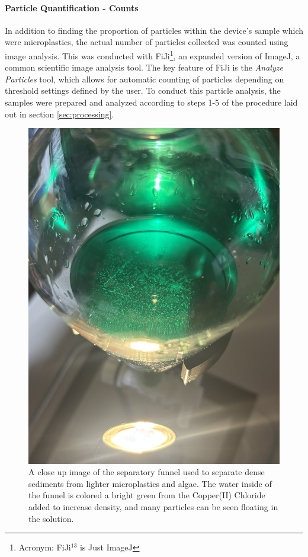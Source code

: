 \documentclass[fleqn,10pt]{SelfArx} %
\begin{document}
	\paragraph*{Particle Quantification - Counts}
	In addition to finding the proportion of particles within the device's sample which were microplastics, the actual number of particles collected was counted using image analysis. This was conducted with FiJi\footnote{Acronym: FiJi$^{13}$ is Just ImageJ}, an expanded version of ImageJ, a common scientific image analysis tool. The key feature of FiJi is the \textit{Analyze Particles} tool, which allows for automatic counting of particles depending on threshold settings defined by the user. To conduct this particle analysis, the samples were prepared and analyzed according to steps 1-5 of the procedure laid out in section \ref{sec:processing}. 
	\begin{figure}[h]
		\centering
		\includegraphics[angle=-90,origin=c,width=1\linewidth]{Figures/SepFunnel}
		\caption[Separatory Funnel]{A close up image of the separatory funnel used to separate dense sediments from lighter microplastics and algae. The water inside of the funnel is colored a bright green from the Copper(II) Chloride added to increase density, and many particles can be seen floating in the solution.}
		\label{fig:SepFunnel}
		
	\end{figure}
\end{document}
